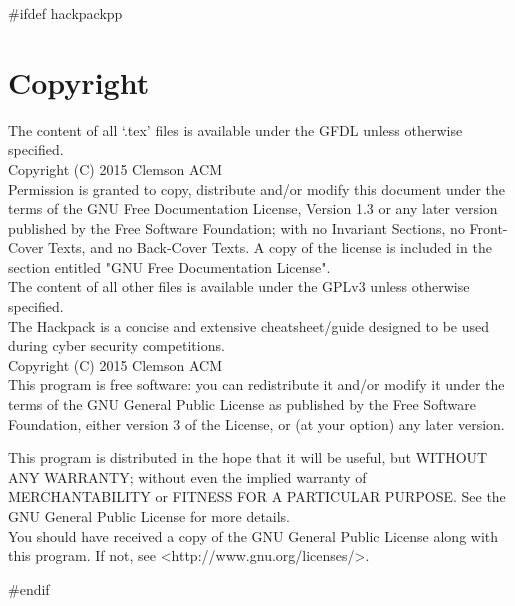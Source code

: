 #ifdef hackpackpp
\section*{Copyright}
The content of all `.tex' files is available under the GFDL unless otherwise specified. \\
Copyright (C)  2015  Clemson ACM \\
Permission is granted to copy, distribute and/or modify this document
under the terms of the GNU Free Documentation License, Version 1.3
or any later version published by the Free Software Foundation;
with no Invariant Sections, no Front-Cover Texts, and no Back-Cover Texts.
A copy of the license is included in the section entitled "GNU
Free Documentation License".\\

The content of all other files is available under the GPLv3 unless otherwise specified. \\
The Hackpack is a concise and extensive cheatsheet/guide designed to be used during cyber security competitions. \\
Copyright (C) 2015  Clemson ACM \\

This program is free software: you can redistribute it and/or modify
it under the terms of the GNU General Public License as published by
the Free Software Foundation, either version 3 of the License, or
(at your option) any later version.

This program is distributed in the hope that it will be useful,
but WITHOUT ANY WARRANTY; without even the implied warranty of
MERCHANTABILITY or FITNESS FOR A PARTICULAR PURPOSE\@.  See the
GNU General Public License for more details. \\

You should have received a copy of the GNU General Public License
along with this program.  If not, see <http://www.gnu.org/licenses/>.

\break
#endif

